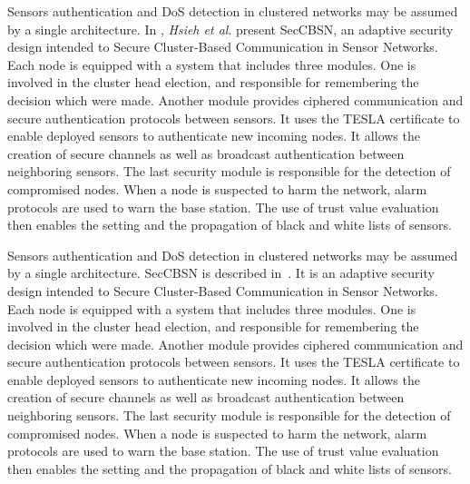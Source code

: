 Sensors authentication and DoS detection in clustered networks may be assumed by a single architecture.
In
\cite{HHC07},
\textit{Hsieh et al}. present SecCBSN, an adaptive security design intended to Secure Cluster-Based Communication in Sensor Networks.
Each node is equipped with a system that includes three modules.
One is involved in the cluster head election, and responsible for remembering the decision which were made.
Another module provides ciphered communication and secure authentication protocols between sensors.
It uses the TESLA certificate to enable deployed sensors to authenticate new incoming nodes.
It allows the creation of secure channels as well as broadcast authentication between neighboring sensors.
The last security module is responsible for the detection of compromised nodes.
When a node is suspected to harm the network, alarm protocols are used to warn the base station.
The use of trust value evaluation then enables the setting and the propagation of black and white lists of sensors.


Sensors authentication and DoS detection in clustered networks may be assumed by a single architecture.
SecCBSN is described in~\cite{HHC07}.
It is an adaptive security design intended to Secure Cluster-Based Communication in Sensor Networks.
Each node is equipped with a system that includes three modules.
One is involved in the cluster head election, and responsible for remembering the decision which were made.
Another module provides ciphered communication and secure authentication protocols between sensors.
It uses the TESLA certificate to enable deployed sensors to authenticate new incoming nodes.
It allows the creation of secure channels as well as broadcast authentication between neighboring sensors.
The last security module is responsible for the detection of compromised nodes.
When a node is suspected to harm the network, alarm protocols are used to warn the base station.
The use of trust value evaluation then enables the setting and the propagation of black and white lists of sensors.



